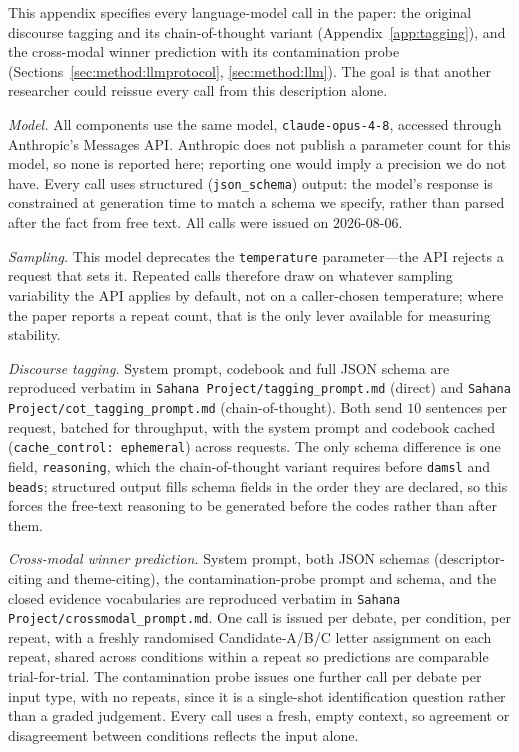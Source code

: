 \documentclass[journal]{IEEEtran}
\begin{document}
This appendix specifies every language-model call in the paper: the original
discourse tagging and its chain-of-thought variant (Appendix~\ref{app:tagging}),
and the cross-modal winner prediction with its contamination probe
(Sections~\ref{sec:method:llmprotocol}, \ref{sec:method:llm}). The goal is
that another researcher could reissue every call from this description
alone.

\emph{Model.} All components use the same model, \texttt{claude-opus-4-8},
accessed through Anthropic's Messages API. Anthropic does not publish a
parameter count for this model, so none is reported here; reporting one would
imply a precision we do not have. Every call uses structured
(\texttt{json\_schema}) output: the model's response is constrained at
generation time to match a schema we specify, rather than parsed after the
fact from free text. All calls were issued on $2026$-$08$-$06$.

\emph{Sampling.} This model deprecates the \texttt{temperature}
parameter---the API rejects a request that sets it. Repeated calls therefore
draw on whatever sampling variability the API applies by default, not on a
caller-chosen temperature; where the paper reports a repeat count, that is
the only lever available for measuring stability.

\emph{Discourse tagging.} System prompt, codebook and full JSON schema are
reproduced verbatim in \texttt{Sahana Project/tagging\_prompt.md} (direct)
and \texttt{Sahana Project/cot\_tagging\_prompt.md} (chain-of-thought). Both
send $10$ sentences per request, batched for throughput, with the system
prompt and codebook cached (\texttt{cache\_control: ephemeral}) across
requests. The only schema difference is one field, \texttt{reasoning}, which
the chain-of-thought variant requires before \texttt{damsl} and
\texttt{beads}; structured output fills schema fields in the order they are
declared, so this forces the free-text reasoning to be generated before the
codes rather than after them.

\emph{Cross-modal winner prediction.} System prompt, both JSON schemas
(descriptor-citing and theme-citing), the contamination-probe prompt and
schema, and the closed evidence vocabularies are reproduced verbatim in
\texttt{Sahana Project/crossmodal\_prompt.md}. One call is issued per debate,
per condition, per repeat, with a freshly randomised Candidate-A/B/C letter
assignment on each repeat, shared across conditions within a repeat so
predictions are comparable trial-for-trial. The contamination probe issues
one further call per debate per input type, with no repeats, since it is a
single-shot identification question rather than a graded judgement. Every
call uses a fresh, empty context, so agreement or disagreement between
conditions reflects the input alone.
\end{document}
